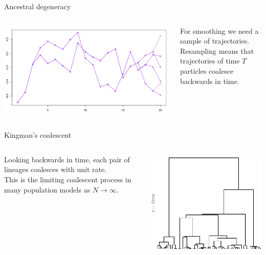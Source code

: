 \documentclass[aspectratio=169]{beamer}
\theoremstyle{definition}
\begin{document}
\begin{frame}{Ancestral degeneracy}
\begin{columns}
\begin{column}{0.6\textwidth}
\includegraphics[width=\textwidth]{../degeneracy.pdf}
\end{column}
\begin{column}{0.35\textwidth}
For smoothing we need a sample of trajectories.\\[7pt]
Resampling means that trajectories of time $T$ particles coalesce backwards in time.
\end{column}
\end{columns}
\end{frame}

\begin{frame}{Kingman's coalescent}
\begin{columns}
\begin{column}{0.45\textwidth}
Looking backwards in time, each pair of lineages coalesces with unit rate.\\[7pt]
This is the limiting coalescent process in many population models as $N\to\infty$.
\end{column}
\begin{column}{0.45\textwidth}
\includegraphics[width=\textwidth]{../kingman.png}
\end{column}
\end{columns}
\end{frame}
\end{document}

